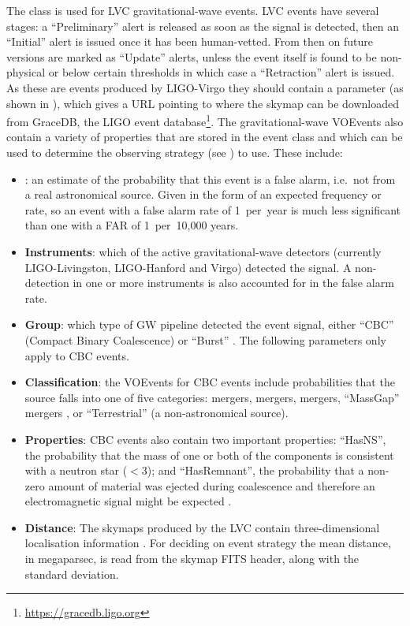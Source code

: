 \begin{colsection}
The  class is used for LVC gravitational-wave events. LVC events have several stages: a ``Preliminary'' alert is released as soon as the signal is detected, then an ``Initial'' alert is issued once it has been human-vetted. From then on future versions are marked as ``Update'' alerts, unless the event itself is found to be non-physical or below certain thresholds in which case a ``Retraction'' alert is issued. As these are events produced by LIGO-Virgo they should contain a  parameter (as shown in ), which gives a URL pointing to where the skymap can be downloaded from GraceDB, the LIGO event database\footnote{\url{https://gracedb.ligo.org}}. The gravitational-wave VOEvents also contain a variety of properties that are stored in the event class and which can be used to determine the observing strategy (see ) to use. These include:
\begin{itemize}
    \item \textbf{}: an estimate of the probability that this event is a false alarm, i.e.\ not from a real astronomical source. Given in the form of an expected frequency or rate, so an event with a false alarm rate of 1~per~year is much less significant than one with a FAR of 1~per~10,000 years.
    \item \textbf{Instruments}: which of the active gravitational-wave detectors (currently LIGO-Livingston, LIGO-Hanford and Virgo) detected the signal. A non-detection in one or more instruments is also accounted for in the false alarm rate.
    \item \textbf{Group}: which type of GW pipeline detected the event signal, either ``CBC'' (Compact Binary Coalescence) or ``Burst'' \citep[other, unmodelled detections, see][]{GW_burst}. The following parameters only apply to CBC events.
    \item \textbf{Classification}: the VOEvents for CBC events include probabilities that the source falls into one of five categories:  mergers,  mergers,  mergers, ``MassGap'' mergers \citep[one or other of the components is in the hypothetical ``mass gap'' between neutron stars and black holes, defined as 3--\SI{5}{\solarmass};][]{GW_MassGap}, or ``Terrestrial'' (a non-astronomical source).
    \item \textbf{Properties}: CBC events also contain two important properties: ``HasNS'', the probability that the mass of one or both of the components is consistent with a neutron star ($<$\SI{3}{\solarmass}); and ``HasRemnant'', the probability that a non-zero amount of material was ejected during coalescence and therefore an electromagnetic signal might be expected \citep{LVC_userguide}.
    \item \textbf{Distance}: The skymaps produced by the LVC contain three-dimensional localisation information \citep{GW_distance}. For deciding on event strategy the mean distance, in megaparsec, is read from the skymap FITS header, along with the standard deviation.
\end{itemize}


\end{colsection}

